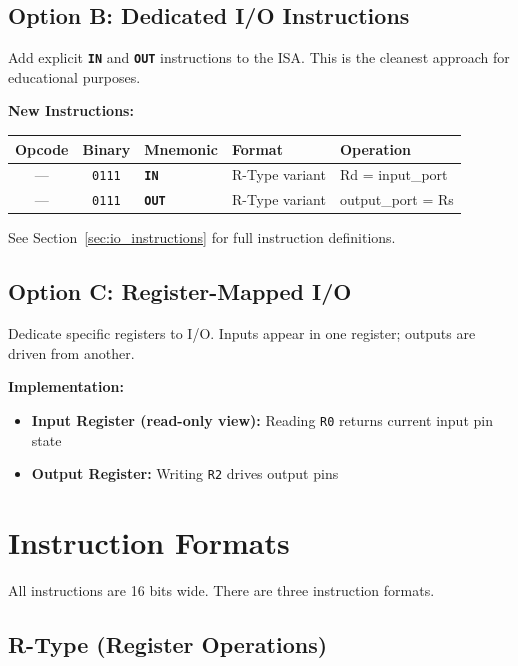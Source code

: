 \documentclass[11pt,a4paper]{article}
\newcommand{\reg}[1]{\texttt{R#1}}
\newcommand{\instr}[1]{\texttt{\textbf{#1}}}
\begin{document}
\subsection{Option B: Dedicated I/O Instructions}

Add explicit \instr{IN} and \instr{OUT} instructions to the ISA. This is the cleanest approach for educational purposes.

\textbf{New Instructions:}

\begin{table}[H]
\centering
\begin{tabular}{@{}cclll@{}}
\toprule
\textbf{Opcode} & \textbf{Binary} & \textbf{Mnemonic} & \textbf{Format} & \textbf{Operation} \\
\midrule
--- & \texttt{0111} & \instr{IN}  & R-Type variant & Rd = input\_port \\
--- & \texttt{0111} & \instr{OUT} & R-Type variant & output\_port = Rs \\
\bottomrule
\end{tabular}
\end{table}

See Section~\ref{sec:io_instructions} for full instruction definitions.

\subsection{Option C: Register-Mapped I/O}

Dedicate specific registers to I/O. Inputs appear in one register; outputs are driven from another.

\textbf{Implementation:}
\begin{itemize}[nosep]
  \item \textbf{Input Register (read-only view):} Reading \reg{0} returns current input pin state
  \item \textbf{Output Register:} Writing \reg{2} drives output pins
\end{itemize}

\section{Instruction Formats}

All instructions are 16 bits wide. There are three instruction formats.

\subsection{R-Type (Register Operations)}
\end{document}
